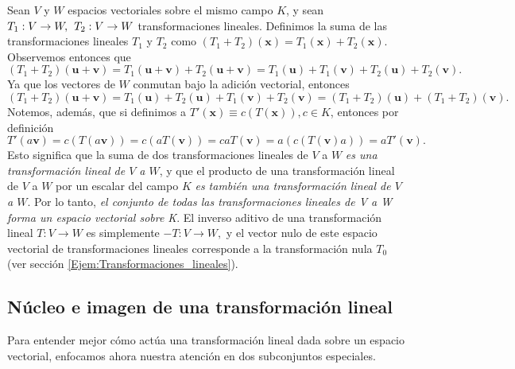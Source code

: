 \documentclass[12pt]{article}
\begin{document}
Sean $V$ y $W$ espacios vectoriales sobre el mismo campo $K$, y sean $T_1:V\to W,\hspace{1.5mm} T_2:V\to W$ transformaciones lineales. Definimos la suma de las transformaciones lineales $T_1$ y $T_2$ como $(T_1+T_2)(\mathbf{x})=T_1(\mathbf{x})+T_2(\mathbf{x})$. Observemos entonces que \[
    (T_1+T_2)(\mathbf{u}+\mathbf{v})=T_1(\mathbf{u}+\mathbf{v})+T_2(\mathbf{u}+\mathbf{v})=T_1(\mathbf{u})+T_1(\mathbf{v})+T_2(\mathbf{u})+T_2(\mathbf{v})
.\] Ya que los vectores de $W$ conmutan bajo la adición vectorial, entonces \[
(T_1+T_2)(\mathbf{u}+\mathbf{v})=T_1(\mathbf{u})+T_2(\mathbf{u})+T_1(\mathbf{v})+T_2(\mathbf{v})=(T_1+T_2)(\mathbf{u})+(T_1+T_2)(\mathbf{v})
.\] Notemos, además, que si definimos a $T'(\mathbf{x})\equiv c(T(\mathbf{x})), c\in K$, entonces por definición $$T'(a\mathbf{v})=c(T(a\mathbf{v}))=c(aT(\mathbf{v}))=caT(\mathbf{v})=a(c(T(\mathbf{v})a))=aT'(\mathbf{v}).$$ Esto significa que la suma de dos transformaciones lineales de $V$ a $W$ \emph{es una transformación lineal de $V$ a $W$}, y que el producto de una transformación lineal de $V$ a $W$ por un escalar del campo $K$ \emph{es también una transformación lineal de $V$ a $W$}. Por lo tanto, \emph{el conjunto de todas las transformaciones lineales de V a W forma un espacio vectorial sobre K}. El inverso aditivo de una transformación lineal $T:V\to W$ es simplemente $-T:V\to W,$ y el vector nulo de este espacio vectorial de transformaciones lineales corresponde a la transformación nula $T_0$ (ver sección \ref{Ejem:Transformaciones_lineales}).

\subsection{Núcleo e imagen de una transformación lineal}

Para entender mejor cómo actúa una transformación lineal dada sobre un espacio vectorial, enfocamos ahora nuestra atención en dos subconjuntos especiales.
\end{document}
